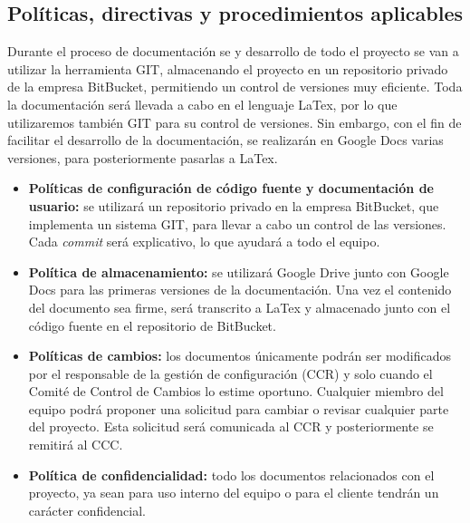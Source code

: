 \subsection{Políticas, directivas y procedimientos aplicables}\label{subsec:politics}
\par Durante el proceso de documentación se y desarrollo de todo el proyecto se van a utilizar la herramienta GIT, almacenando el proyecto en un repositorio privado de la empresa BitBucket, permitiendo un control de versiones muy eficiente. Toda la documentación será llevada a cabo en el lenguaje LaTex, por lo que utilizaremos también GIT para su control de versiones. Sin embargo, con el fin de facilitar el desarrollo de la documentación, se realizarán en Google Docs varias versiones, para posteriormente pasarlas a LaTex.

\begin{itemize}[-]
  \item \textbf{Políticas de configuración de código fuente y documentación de usuario:} se utilizará un repositorio privado en la empresa BitBucket, que implementa un sistema GIT, para llevar a cabo un control de las versiones. Cada \textit{commit} será explicativo, lo que ayudará a todo el equipo.
  \item \textbf{Política de almacenamiento:} se utilizará Google Drive junto con Google Docs para las primeras versiones de la documentación. Una vez el contenido del documento sea firme, será transcrito a LaTex y almacenado junto con el código fuente en el repositorio de BitBucket.
  \item \textbf{Políticas de cambios:} los documentos únicamente podrán ser modificados por el responsable de la gestión de configuración (CCR) y solo cuando el Comité de Control de Cambios lo estime oportuno. Cualquier miembro del equipo podrá proponer una solicitud para cambiar o revisar cualquier parte del proyecto. Esta solicitud será comunicada al CCR y posteriormente se remitirá al CCC.
  \item \textbf{Política de confidencialidad:} todo los documentos relacionados con el proyecto, ya sean para uso interno del equipo o para el cliente tendrán un carácter confidencial.
\end{itemize}
